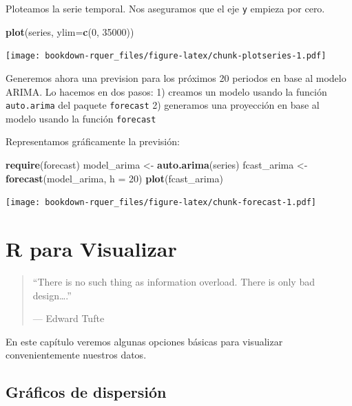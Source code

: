 \documentclass[]{book}
\newenvironment{Shaded}{\begin{snugshade}}{\end{snugshade}}
\newcommand{\DataTypeTok}[1]{\textcolor[rgb]{0.13,0.29,0.53}{#1}}
\newcommand{\DecValTok}[1]{\textcolor[rgb]{0.00,0.00,0.81}{#1}}
\newcommand{\KeywordTok}[1]{\textcolor[rgb]{0.13,0.29,0.53}{\textbf{#1}}}
\newcommand{\NormalTok}[1]{#1}
\newcommand{\StringTok}[1]{\textcolor[rgb]{0.31,0.60,0.02}{#1}}
\theoremstyle{definition}
\theoremstyle{definition}
\theoremstyle{definition}
\theoremstyle{remark}
\begin{document}
Ploteamos la serie temporal. Nos aseguramos que el eje \texttt{y}
empieza por cero.

\begin{Shaded}
\begin{Highlighting}[]
\KeywordTok{plot}\NormalTok{(series, }\DataTypeTok{ylim=}\KeywordTok{c}\NormalTok{(}\DecValTok{0}\NormalTok{, }\DecValTok{35000}\NormalTok{))}
\end{Highlighting}
\end{Shaded}

\texttt{[image: bookdown-rquer\_files/figure-latex/chunk-plotseries-1.pdf]}

Generemos ahora una prevision para los próximos 20 periodos en base al
modelo ARIMA. Lo hacemos en dos pasos: 1) creamos un modelo usando la
función \texttt{auto.arima} del paquete \texttt{forecast} 2) generamos
una proyección en base al modelo usando la función \texttt{forecast}

Representamos gráficamente la previsión:

\begin{Shaded}
\begin{Highlighting}[]
\KeywordTok{require}\NormalTok{(forecast)}
\NormalTok{model_arima <-}\StringTok{ }\KeywordTok{auto.arima}\NormalTok{(series)}
\NormalTok{fcast_arima <-}\StringTok{ }\KeywordTok{forecast}\NormalTok{(model_arima, }\DataTypeTok{h =} \DecValTok{20}\NormalTok{)}
\KeywordTok{plot}\NormalTok{(fcast_arima)}
\end{Highlighting}
\end{Shaded}

\texttt{[image: bookdown-rquer\_files/figure-latex/chunk-forecast-1.pdf]}

\hypertarget{r-para-visualizar}{%
\chapter{R para Visualizar}\label{r-para-visualizar}}

\begin{quote}
``There is no such thing as information overload. There is only bad
design\ldots{}.''

--- Edward Tufte
\end{quote}

En este capítulo veremos algunas opciones básicas para visualizar
convenientemente nuestros datos.

\hypertarget{graficos-de-dispersion}{%
\section{Gráficos de dispersión}\label{graficos-de-dispersion}}
\end{document}
